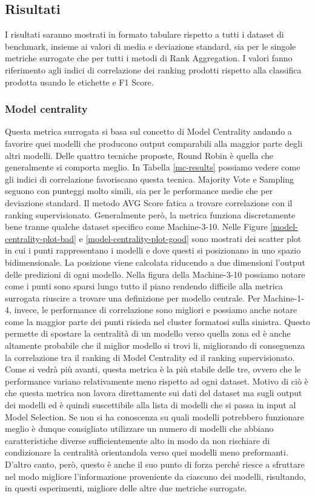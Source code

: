 \subsection{Risultati}
I risultati saranno mostrati in formato tabulare rispetto a tutti i dataset di benchmark, insieme ai valori di media e deviazione standard, sia per le singole metriche surrogate che per tutti i metodi di Rank Aggregation.
I valori fanno riferimento agli indici di correlazione dei ranking prodotti rispetto alla classifica prodotta usando le etichette e F1 Score.


\subsubsection{Model centrality}
Questa metrica surrogata si basa sul concetto di Model Centrality andando a favorire quei modelli che producono output comparabili alla maggior parte degli altri modelli. Delle quattro tecniche proposte, Round Robin è quella che generalmente si comporta meglio. In Tabella \ref{mc-results} possiamo vedere come gli indici di correlazione favoriscano questa tecnica.
Majority Vote e Sampling seguono con punteggi molto simili, sia per le performance medie che per deviazione standard. Il metodo AVG Score fatica a trovare correlazione con il ranking supervisionato. 
Generalmente però, la metrica funziona discretamente bene tranne qualche dataset specifico come Machine-3-10.  Nelle Figure \ref{model-centrality-plot-bad} e \ref{model-centrality-plot-good} sono mostrati dei scatter plot in cui i punti rappresentano i modelli e dove questi si posizionano in uno spazio bidimensionale. La posizione viene calcolata riducendo a due dimensioni l'output delle predizioni di ogni modello.  Nella figura della Machine-3-10 possiamo notare come i punti sono sparsi lungo tutto il piano rendendo difficile alla metrica surrogata riuscire a trovare una definizione per modello centrale.
Per Machine-1-4, invece, le performance di correlazione sono migliori e possiamo anche notare come la maggior parte dei punti risieda nel cluster formatosi sulla sinistra. Questo permette di spostare la centralità di un modello verso quella zona ed è anche altamente probabile che il miglior modello si trovi li, migliorando di conseguenza la correlazione tra il ranking di Model Centrality ed il ranking supervisionato.
Come si vedrà più avanti, questa metrica è la più stabile delle tre, ovvero che le performance variano relativamente meno rispetto ad ogni dataset. Motivo di ciò è che questa metrica non lavora direttamente sui dati del dataset ma sugli output dei modelli ed è quindi suscettibile alla lista di modelli che si passa in input al Model Selection. Se non si ha conoscenza su quali modelli potrebbero funzionare meglio è dunque consigliato utilizzare un numero di modelli che abbiano caratteristiche diverse sufficientemente alto in modo da non rischiare di condizionare la centralità orientandola verso quei modelli meno preformanti.
D'altro canto, però, questo è anche il suo punto di forza perché riesce a sfruttare nel modo migliore l'informazione proveniente da ciascuno dei modelli, risultando, in questi esperimenti, migliore delle altre due metriche surrogate.

